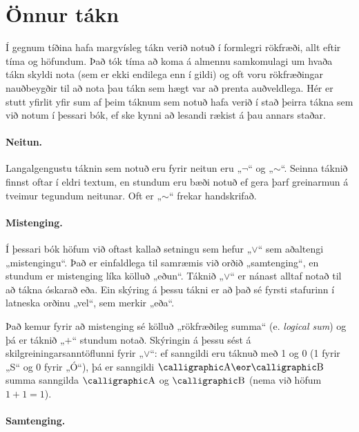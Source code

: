 
\section{Önnur tákn}
Í gegnum tíðina hafa margvísleg tákn verið notuð í formlegri rökfræði, allt eftir tíma og höfundum. Það tók tíma að koma á almennu samkomulagi um hvaða tákn skyldi nota (sem er ekki endilega enn í gildi) og oft voru rökfræðingar nauðbeygðir til að nota þau tákn sem hægt var að prenta auðveldlega. Hér er stutt yfirlit yfir sum af þeim táknum sem notuð hafa verið í stað þeirra tákna sem við notum í þessari bók, ef ske kynni að lesandi rækist á þau annars staðar.

\paragraph{Neitun.} Langalgengustu táknin sem notuð eru fyrir neitun eru „$\neg$“ og „${\sim}$“. Seinna táknið finnst oftar í eldri textum, en stundum eru bæði notuð ef gera þarf greinarmun á tveimur tegundum neitunar. Oft er „${\sim}$“ frekar handskrifað.

\paragraph{Mistenging.} Í þessari bók höfum við oftast kallað setningu sem hefur „$\vee$“ sem aðaltengi „mistengingu“. Það er einfaldlega til samræmis við orðið „samtenging“, en stundum er mistenging líka kölluð „eðun“. Táknið „$\vee$“ er nánast alltaf notað til að tákna óskarað eða. Ein skýring á þessu tákni er að það sé fyrsti stafurinn í latneska orðinu „vel“, sem merkir „eða“. 

Það kemur fyrir að mistenging sé kölluð „rökfræðileg summa“ (e. \emph{logical sum}) og þá er táknið „$+$“ stundum notað. Skýringin á þessu sést á skilgreiningarsanntöflunni fyrir „$\vee$“: ef sanngildi eru táknuð með 1 og 0 (1 fyrir „S“ og 0 fyrir „Ó“), þá er sanngildi $\meta{A} \eor \meta{B}$ summa sanngilda $\meta{A}$ og $\meta{B}$ (nema við höfum $1+1 = 1$).

\paragraph{Samtenging.}

